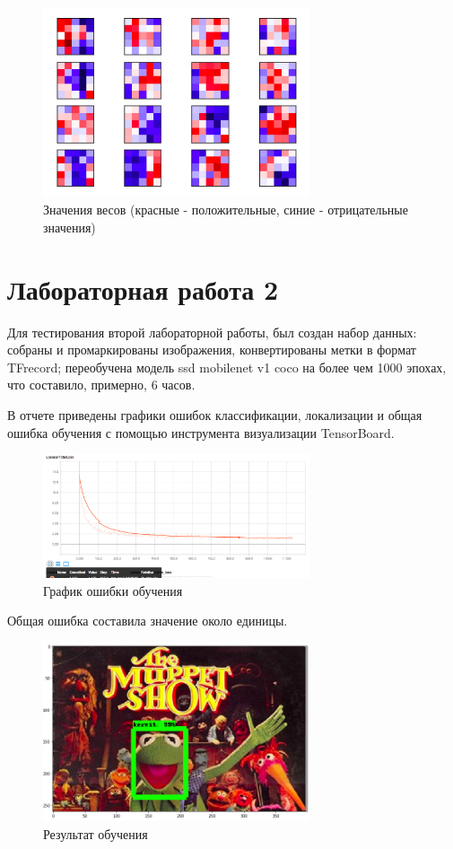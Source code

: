 \begin{figure}[htbp]
\centering
\includegraphics[width=0.7\textwidth]{fig/weig}
\caption{Значения весов (красные - положительные, синие - отрицательные значения)}%
\label{fig:weig}
\end{figure}

\section{Лабораторная работа 2}
Для тестирования второй лабораторной работы, был создан набор данных: собраны и промаркированы изображения, конвертированы метки в формат TFrecord; переобучена модель ssd mobilenet v1 coco на более чем 1000 эпохах, что составило, примерно, 6 часов.

В отчете приведены графики ошибок классификации, локализации и общая ошибка обучения с помощью инструмента визуализации TensorBoard.

\begin{figure}[htbp]
\centering
\includegraphics[width=0.7\textwidth]{fig/img3}
\caption{График ошибки обучения}%
\label{fig:san}
\end{figure}

Общая ошибка составила значение около единицы.

\begin{figure}[htbp]
\centering
\includegraphics[width=0.7\textwidth]{fig/kermit}
\caption{Результат обучения}
\label{fig:kermit}
\end{figure}

